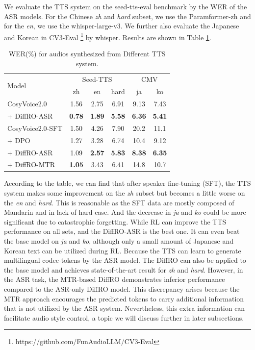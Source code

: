 \documentclass[a4paper]{article}
\begin{document}
We evaluate the TTS system on the seed-tts-eval benchmark by the WER of the ASR models. For the Chinese \textit{zh} and \textit{hard} subset, we use the Paramformer-zh \cite{gao22b_interspeech} and for the \textit{en}, we use the whisper-large-v3\cite{radford2022robustspeechrecognitionlargescale}. We further also evaluate the Japanese and Korean in CV3-Eval \footnote{https://github.com/FunAudioLLM/CV3-Eval} by whisper. Results are shown in Table \ref{tab:asr_result}.

\begin{table}[!t]
    \centering
    \begin{tabular}{l ccc cc}
    \hline
        \multirow{2}{*}{Model} & \multicolumn{3}{c}{Seed-TTS}& \multicolumn{2}{c}{CMV} \\
        & zh & en & hard & ja & ko \\
    \hline
        CosyVoice2.0 &  1.56 &  2.75 &  6.91 & 9.13 & 7.43 \\
         + DiffRO-ASR &  \textbf{0.78} & \textbf{1.89}  & \textbf{5.58}  & \textbf{6.36} & \textbf{5.41} \\
    \hline
        CosyVoice2.0-SFT &  1.50 &  4.26 &  7.90 & 20.2 & 11.1 \\
         + DPO &  1.27 & 3.28 & 6.74 & 10.4 & 9.12 \\
         + DiffRO-ASR & 1.09 & \textbf{2.57} & \textbf{5.83} & \textbf{8.38} & \textbf{6.35} \\
         + DiffRO-MTR & \textbf{1.05} & 3.43 & 6.41 & 14.8 & 10.7 \\
    \hline
    \end{tabular}
    \caption{WER(\%) for audios synthesized from Different TTS system.}
    \label{tab:asr_result}
\end{table}

According to the table, we can find that after speaker fine-tuning (SFT), the TTS system makes some improvement on the \textit{zh} subset but becomes a little worse on the \textit{en} and \textit{hard}. This is reasonable as the SFT data are mostly composed of Mandarin and in lack of hard case. And the decrease in \textit{ja} and \textit{ko} could be more significant due to catastrophic forgetting.
While RL can improve the TTS performance on all sets, and the DiffRO-ASR is the best one. It can even beat the base model on \textit{ja} and \textit{ko}, although only a small amount of Japanese and Korean text can be utilized during RL. 
Because the TTS can learn to generate multilingual codec-tokens by the ASR model.
The DiffRO can also be applied to the base model and achieves state-of-the-art result for \textit{zh} and \textit{hard}. 
However, in the ASR task, the MTR-based DiffRO demonstrates inferior performance compared to the ASR-only DiffRO model. This discrepancy arises because the MTR approach encourages the predicted tokens to carry additional information that is not utilized by the ASR system. Nevertheless, this extra information can facilitate audio style control, a topic we will discuss further in later subsections.
\end{document}
